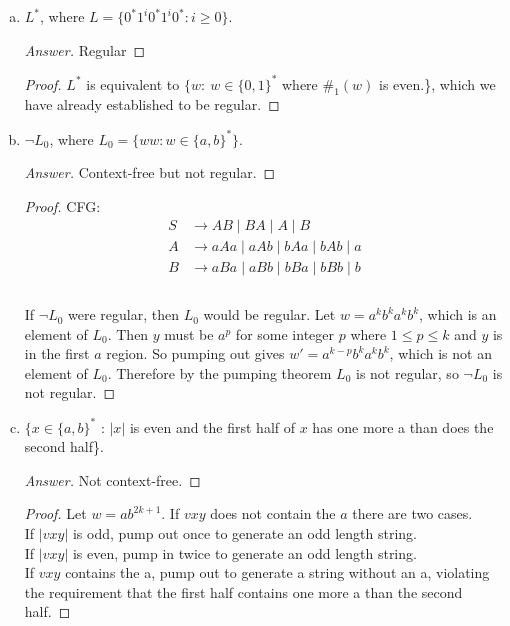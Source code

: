 \documentclass[10pt]{article}
\newcommand{\card}[1]{\left| #1 \right|}
\begin{document}
\begin{enumerate}[1)]
\begin{enumerate}[a)]
\item
$L^*$, where $L = \{0^*1^i0^*1^i0^* : i \geq 0\}$.
\begin{proof}[Answer]
Regular
\end{proof}
\begin{proof}[Proof]
$L^*$ is equivalent to $\{w:\ w \in \{0, 1\}^*$ where $\#_1(w)$ is even.\}, which we have already established to be regular.
\end{proof}

\pagebreak
\item
$\lnot L_0$, where $L_0 = \{ww : w \in \{a, b\}^*\}$.
\begin{proof}[Answer]
Context-free but not regular.
\end{proof}
\begin{proof}[Proof]
CFG:
\begin{align*}
S &\rightarrow AB \mid BA \mid A \mid B\\
A &\rightarrow aAa \mid aAb \mid bAa \mid bAb \mid a\\
B &\rightarrow aBa \mid aBb \mid bBa \mid bBb \mid b\\
\end{align*}\\
If $\lnot L_0$ were regular, then $L_0$ would be regular.  Let $w = a^kb^ka^kb^k$, which is an element of $L_0$.  Then $y$ must be $a^p$ for some integer $p$ where $1 \leq p \leq k$ and $y$ is in the first $a$ region.  So pumping out gives $w' = a^{k-p}b^ka^kb^k$, which is not an element of $L_0$.  Therefore by the pumping theorem $L_0$ is not regular, so $\lnot L_0$ is not regular.
\end{proof}

\item
$\{x \in \{a, b\}^*$ : $\card{x}$ is even and the first half of $x$ has one more a than does the second half\}.
\begin{proof}[Answer]
Not context-free.
\end{proof}
\begin{proof}[Proof]
Let $w = ab^{2k+1}$.  If $vxy$ does not contain the $a$ there are two cases.\\
If $\card{vxy}$ is odd, pump out once to generate an odd length string.\\
If $\card{vxy}$ is even, pump in twice to generate an odd length string.\\
If $vxy$ contains the a, pump out to generate a string without an a, violating the requirement that the first half contains one more a than the second half.
\end{proof}
\end{enumerate}


\end{enumerate}
\end{document}
